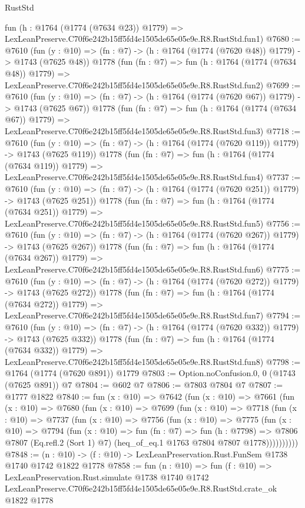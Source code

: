 \begin{lexlean}{RustStd}
\begin{coremodule}
    fun (h : @1764 (@1774 (@7634 @23)) @1779) =>
    LexLeanPreserve.C70f6e242b15ff5fd4e1505de65e05e9e.R8.RustStd.fun1)
@7680 := @7610
    (fun (y : @10) => (fn : @7) -> (h : @1764 (@1774 (@7620 @48)) @1779) -> @1743 (@7625 @48))
    @1778
    (fun (fn : @7) =>
    fun (h : @1764 (@1774 (@7634 @48)) @1779) =>
    LexLeanPreserve.C70f6e242b15ff5fd4e1505de65e05e9e.R8.RustStd.fun2)
@7699 := @7610
    (fun (y : @10) => (fn : @7) -> (h : @1764 (@1774 (@7620 @67)) @1779) -> @1743 (@7625 @67))
    @1778
    (fun (fn : @7) =>
    fun (h : @1764 (@1774 (@7634 @67)) @1779) =>
    LexLeanPreserve.C70f6e242b15ff5fd4e1505de65e05e9e.R8.RustStd.fun3)
@7718 := @7610
    (fun (y : @10) => (fn : @7) -> (h : @1764 (@1774 (@7620 @119)) @1779) -> @1743 (@7625 @119))
    @1778
    (fun (fn : @7) =>
    fun (h : @1764 (@1774 (@7634 @119)) @1779) =>
    LexLeanPreserve.C70f6e242b15ff5fd4e1505de65e05e9e.R8.RustStd.fun4)
@7737 := @7610
    (fun (y : @10) => (fn : @7) -> (h : @1764 (@1774 (@7620 @251)) @1779) -> @1743 (@7625 @251))
    @1778
    (fun (fn : @7) =>
    fun (h : @1764 (@1774 (@7634 @251)) @1779) =>
    LexLeanPreserve.C70f6e242b15ff5fd4e1505de65e05e9e.R8.RustStd.fun5)
@7756 := @7610
    (fun (y : @10) => (fn : @7) -> (h : @1764 (@1774 (@7620 @267)) @1779) -> @1743 (@7625 @267))
    @1778
    (fun (fn : @7) =>
    fun (h : @1764 (@1774 (@7634 @267)) @1779) =>
    LexLeanPreserve.C70f6e242b15ff5fd4e1505de65e05e9e.R8.RustStd.fun6)
@7775 := @7610
    (fun (y : @10) => (fn : @7) -> (h : @1764 (@1774 (@7620 @272)) @1779) -> @1743 (@7625 @272))
    @1778
    (fun (fn : @7) =>
    fun (h : @1764 (@1774 (@7634 @272)) @1779) =>
    LexLeanPreserve.C70f6e242b15ff5fd4e1505de65e05e9e.R8.RustStd.fun7)
@7794 := @7610
    (fun (y : @10) => (fn : @7) -> (h : @1764 (@1774 (@7620 @332)) @1779) -> @1743 (@7625 @332))
    @1778
    (fun (fn : @7) =>
    fun (h : @1764 (@1774 (@7634 @332)) @1779) =>
    LexLeanPreserve.C70f6e242b15ff5fd4e1505de65e05e9e.R8.RustStd.fun8)
@7798 := @1764 (@1774 (@7620 @891)) @1779
@7803 := Option.noConfusion.{0, 0} (@1743 (@7625 @891)) @7
@7804 := @602 @7
@7806 := @7803 @7804 @7
@7807 := @1777 @1822
@7840 := fun (x : @10) =>
  @7642
    (fun (x : @10) =>
    @7661
      (fun (x : @10) =>
      @7680
        (fun (x : @10) =>
        @7699
          (fun (x : @10) =>
          @7718
            (fun (x : @10) =>
            @7737
              (fun (x : @10) =>
              @7756
                (fun (x : @10) =>
                @7775
                  (fun (x : @10) =>
                  @7794
                    (fun (x : @10) =>
                    fun (fn : @7) =>
                    fun (h : @7798) =>
                    @7806
                      @7807
                      (Eq.refl.{2} (Sort 1) @7)
                      (heq_of_eq.{1} @1763 @7804 @7807 @1778))))))))))
@7848 := (n : @10) -> (f : @10) -> LexLeanPreservation.Rust.FunSem @1738 @1740 @1742 @1822 @1778
@7858 := fun (n : @10) =>
  fun (f : @10) =>
  LexLeanPreservation.Rust.simulate
    @1738
    @1740
    @1742
    LexLeanPreserve.C70f6e242b15ff5fd4e1505de65e05e9e.R8.RustStd.crate_ok
    @1822
    @1778
\end{coremodule}
\end{lexlean}
